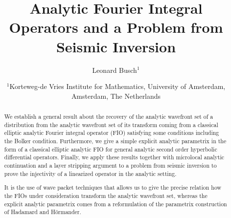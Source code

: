 \documentclass[
	fontsize=11pt, 
	twoside=false, 
	abstract=true, 
	a4paper,
]{scrartcl}
\begin{document}
 

\title{Analytic Fourier Integral Operators and a Problem from Seismic Inversion}

\author{Leonard Busch$^{1}${\href{mailto:l.a.busch@uva.nl}{\color{blue}\Letter}}}%

\date{\footnotesize$^1$Korteweg-de Vries Institute for Mathematics, University of Amsterdam, Amsterdam, The Netherlands}%

\maketitle

\vspace{-2.5\baselineskip}
\begin{abstract}
\noindent
We establish a general result about the recovery of the analytic wavefront set of a distribution from the analytic wavefront set of its transform coming from a classical elliptic analytic Fourier integral operator (FIO) satisfying some conditions including the Bolker condition. Furthermore, we give a simple explicit analytic parametrix in the form of a classical elliptic analytic FIO for general analytic second order hyperbolic differential operators. Finally, we apply these results together with microlocal analytic continuation and a layer stripping argument to a problem from seismic inversion to prove the injectivity of a linearized operator in the analytic setting.

It is the use of wave packet techniques that allows us to %
give the precise relation how the FIOs under consideration transform the analytic wavefront set, whereas the explicit analytic parametrix comes from a reformulation of the parametrix construction of Hadamard and H\"ormander.

\end{abstract}
\end{document}

